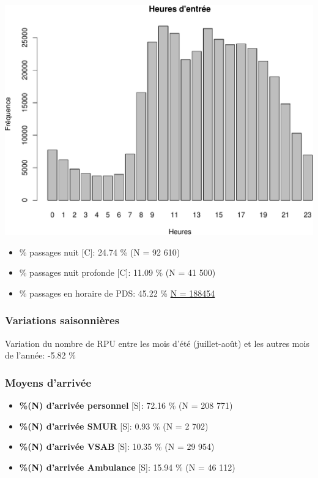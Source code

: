 \documentclass[]{article}
\begin{document}
\includegraphics{rapport2014_V4_files/figure-latex/horaires-1.pdf}

\begin{itemize}
\item
  \% passages nuit {[}C{]}: 24.74 \% (N = 92 610)
\item
  \% passages nuit profonde {[}C{]}: 11.09 \% (N = 41 500)
\item
  \% passages en horaire de PDS: 45.22 \%
  \href{Remarque:\%20ne\%20tient\%20pas\%20compte\%20des\%20jours\%20fériés\%20survenant\%20en\%20semaine}{N
  = 188454}
\end{itemize}

\subsubsection{Variations saisonnières}\label{variations-saisonnieres}

Variation du nombre de RPU entre les mois d'été (juillet-août) et les
autres mois de l'année: -5.82 \%

\subsubsection{Moyens d'arrivée}\label{moyens-darrivee}

\begin{itemize}
\itemsep1pt\parskip0pt
\item
  \textbf{\%(N) d'arrivée personnel} {[}S{]}: 72.16 \% (N = 208 771)
\item
  \textbf{\%(N) d'arrivée SMUR} {[}S{]}: 0.93 \% (N = 2 702)
\item
  \textbf{\%(N) d'arrivée VSAB} {[}S{]}: 10.35 \% (N = 29 954)
\item
  \textbf{\%(N) d'arrivée Ambulance} {[}S{]}: 15.94 \% (N = 46 112)
\end{itemize}
\end{document}
